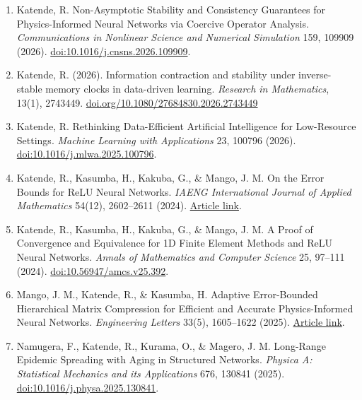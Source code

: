 \documentclass[11pt,a4paper]{article}
\begin{document}
\begin{enumerate}

\item
Katende, R.
Non-Asymptotic Stability and Consistency Guarantees for
Physics-Informed Neural Networks via Coercive Operator Analysis.
\textit{Communications in Nonlinear Science and Numerical Simulation}
159, 109909 (2026).
\href{https://doi.org/10.1016/j.cnsns.2026.109909}
{doi:10.1016/j.cnsns.2026.109909}.

\item
Katende, R. (2026).
Information contraction and stability under inverse-stable memory clocks in data-driven learning.
\textit{Research in Mathematics}, 13(1), 2743449.
\href{https://doi.org/10.1080/27684830.2026.2743449}{doi.org/10.1080/27684830.2026.2743449}

\item
Katende, R.
Rethinking Data-Efficient Artificial Intelligence for Low-Resource
Settings.
\textit{Machine Learning with Applications}
23, 100796 (2026).
\href{https://doi.org/10.1016/j.mlwa.2025.100796}
{doi:10.1016/j.mlwa.2025.100796}.

\item
Katende, R., Kasumba, H., Kakuba, G., \& Mango, J. M.
On the Error Bounds for ReLU Neural Networks.
\textit{IAENG International Journal of Applied Mathematics}
54(12), 2602--2611 (2024).
\href{https://www.iaeng.org/IJAM/issues_v54/issue_12/IJAM_54_12_10.pdf}
{Article link}.

\item
Katende, R., Kasumba, H., Kakuba, G., \& Mango, J. M.
A Proof of Convergence and Equivalence for 1D Finite Element Methods
and ReLU Neural Networks.
\textit{Annals of Mathematics and Computer Science}
25, 97--111 (2024).
\href{https://doi.org/10.56947/amcs.v25.392}
{doi:10.56947/amcs.v25.392}.

\item
Mango, J. M., Katende, R., \& Kasumba, H.
Adaptive Error-Bounded Hierarchical Matrix Compression for Efficient
and Accurate Physics-Informed Neural Networks.
\textit{Engineering Letters}
33(5), 1605--1622 (2025).
\href{https://www.engineeringletters.com/issues_v33/issue_5/EL_33_5_38.pdf}
{Article link}.

\item
Namugera, F., Katende, R., Kurama, O., \& Magero, J. M.
Long-Range Epidemic Spreading with Aging in Structured Networks.
\textit{Physica A: Statistical Mechanics and its Applications}
676, 130841 (2025).
\href{https://doi.org/10.1016/j.physa.2025.130841}
{doi:10.1016/j.physa.2025.130841}.


\end{enumerate}
\end{document}
